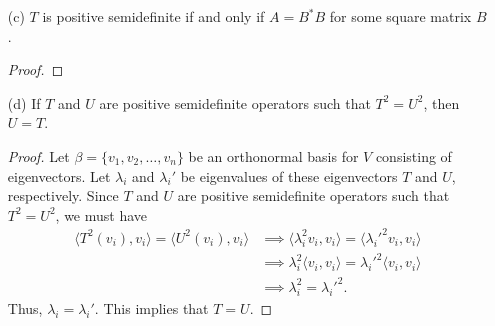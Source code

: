\begin{enumerate}
\begin{proof}
\begin{align*}
            \langle T(x) , x  \rangle &= \Big\langle T \Big(  \sum_{ j=1  }^{ n } \langle x , {v}_{j}  \rangle {v}_{j} \Big)  , \sum_{ i=1  }^{ n } \langle x , {v}_{i} \rangle {v}_{i}  \Big\rangle \\
&= \Big\langle T \Big(  \sum_{ j=1  }^{ n } \langle x , {v}_{j}  \rangle {v}_{j} \Big)  , \sum_{ i=1  }^{ n } \langle x , {v}_{i} \rangle {v}_{i}  \Big\rangle \\
&= \Big\langle \sum_{ j=1  }^{ n } \langle x , {v}_{j} \rangle T({v}_{j}), \sum_{ i=1  }^{ n } \langle x , {v}_{i} \rangle {v}_{i} \Big\rangle \\
&= \sum_{ j=1  }^{ n } \langle x , {v}_{j} \rangle \sum_{ i=1 }^{ n  } \overline{\langle x , {v}_{i} \rangle} \langle T({v}_{j}) , {v}_{i} \rangle \\
&= \sum_{ i,j }^{  } \langle T({v}_{j}) , {v}_{i} \rangle \langle x , {v}_{j} \rangle \overline{\langle x , {v}_{i} \rangle} \\
&= \sum_{ i,j }^{  } {A}_{ij} \langle x , {v}_{j} \rangle \overline{\langle x , {v}_{i} \rangle} > 0.
\end{align*}
Note that \( T  \) is self-adjoint by assumption. Thus, we conclude that \( T  \) is positive definite.
\end{proof}
    \item[(c)] \( T  \) is positive semidefinite if and only if \( A = B^{*} B  \) for some square matrix \( B  \).
        \begin{proof}
        
        \end{proof}
    \item[(d)] If \( T  \) and \( U  \) are positive semidefinite operators such that \( T^{2} = U^{2} \), then \( U = T  \).     
        \begin{proof}
        Let \( \beta = \{ {v}_{1}, {v}_{2}, \dots, {v}_{n} \}   \) be an orthonormal basis for \( V  \) consisting of eigenvectors. Let \( {\lambda}_{i} \) and \( {\lambda}_{i}' \) be eigenvalues of these eigenvectors \( T  \) and \( U  \), respectively. Since \( T  \) and \( U  \) are positive semidefinite operators such that \( T^{2} = U^{2} \), we must have 
       \begin{align*}
           \langle T^{2}({v}_{i}) , {v}_{i} \rangle = \langle U^{2}({v}_{i}) , {v}_{i} \rangle &\implies \langle \lambda_i^{2} {v}_{i}  ,  {v}_{i}  \rangle = \langle  {\lambda}_{i}'^{2} {v}_{i}  ,  {v}_{i}  \rangle \\
                                                                                               &\implies {\lambda}_{i}^{2} \langle {v}_{i}  , {v}_{i}  \rangle = {\lambda}_{i}'^{2} \langle {v}_{i}  , {v}_{i}  \rangle \\
                                                                                               &\implies {\lambda}_{i}^{2} = {\lambda}_{i}'^{2}. 
       \end{align*} 
       Thus, \( {\lambda}_{i} = {\lambda}_{i}' \). This implies that \( T = U  \).


\end{proof}
\end{enumerate}
